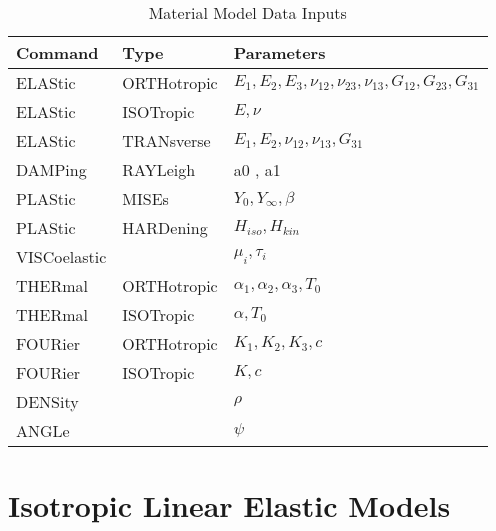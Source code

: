 \begin{table}[ht!]
\begin{center}
\begin{tabular}{| l | l | l |} \hline
Command & Type & Parameters \\ \hline
ELAStic & ORTHotropic & $E_1, E_2, E_3, \nu_{12},
\nu_{23}, \nu_{13}, G_{12}, G_{23}, G_{31}$ \\
ELAStic & ISOTropic & $E, \nu$ \\
ELAStic & TRANsverse & $E_1, E_2, \nu_{12}, \nu_{13}, G_{31}$ \\
DAMPing & RAYLeigh  & a0 , a1 \\
PLAStic & MISEs       & $Y_0, Y_{\infty}, \beta$ \\
PLAStic & HARDening   & $H_{iso}, H_{kin}$ \\
VISCoelastic & & $\mu_i, \tau_i$ \\
THERmal & ORTHotropic & $\alpha_1, \alpha_2, \alpha_3, T_0$ \\
THERmal & ISOTropic   & $\alpha, T_0$ \\ \hline
FOURier & ORTHotropic & $K_1, K_2, K_3, c$ \\
FOURier & ISOTropic   & $K, c$ \\ \hline
DENSity &       & $\rho$ \\ \hline
ANGLe   &       & $\psi$ \\ \hline
\end{tabular}
\end{center}
\caption{Material Model Data Inputs}
\label{tab131a}
\end{table}

\section{Isotropic Linear Elastic Models}
\label{isosel}

